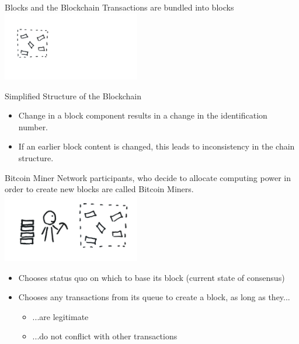 \documentclass[]{beamer}
\begin{document}
\begin{frame}{Blocks and the Blockchain}
Transactions are bundled into blocks \\
\includegraphics[width=6cm]{../assets/images/block_1.png} \\
\end{frame}

\begin{frame}{Simplified Structure of the Blockchain}
\begin{figure}[h!]
	\center
	
\end{figure}
\begin{itemize}
\item{Change in a block component results in a change in the identification number.}
\item{If an earlier block content is changed, this leads to inconsistency in the chain structure.}
\end{itemize}
\end{frame}


\begin{frame}{Bitcoin Miner}
Network participants, who decide to allocate computing power in order to create new blocks are called Bitcoin Miners.
\center
\includegraphics[width=6cm]{../assets/images/miner.png}

\begin{itemize}
\item{Chooses status quo on which to base its block (current state of consensus)}
\item{Chooses any transactions from its queue to create a block, as long as they...}
	\begin{itemize}
	\item{...are legitimate}
	\item{...do not conflict with other transactions}
	\end{itemize}
\end{itemize}
\end{frame}
\end{document}

